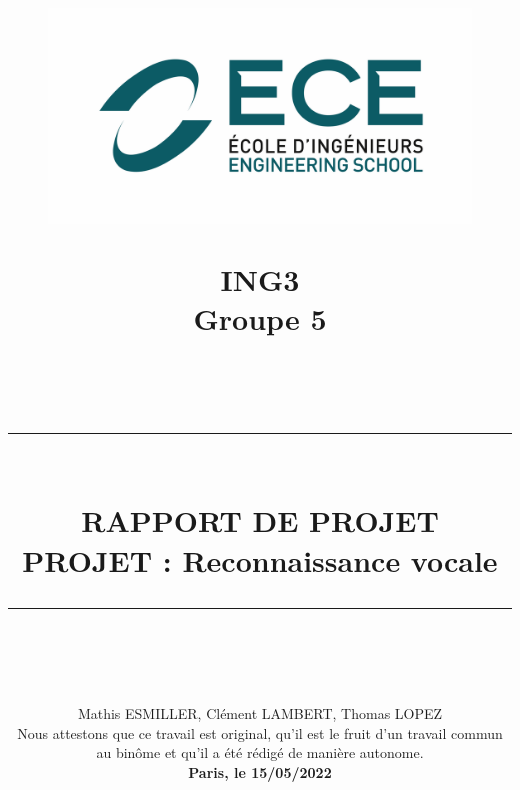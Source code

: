 \documentclass[a4paper,11pt]{book}
\newcommand{\HRule}[1]{\rule{\linewidth}{#1}}
\begin{document}
	
	\begin{titlepage}
	\title{\vspace{-5em}
		\begin{figure}[htb]
			\begin{minipage}[t]{.45\textwidth}
				\centering
				\includegraphics[width=\textwidth]{ece.png}
			\end{minipage}
			\hfill
			\begin{minipage}[t]{.45\textwidth}
				\centering
				\flushright\vspace{-12mm}\Large{\textbf{ING{3}}\\ Groupe {5}}
			\end{minipage}  
		\end{figure}
		\normalsize \textsc{} \\ [1.2cm]
		\HRule{1.5pt} \\ [0.5cm]
		\LARGE \textbf{\Large{RAPPORT DE PROJET}\\ \vspace{5mm}
			\Huge{\textcolor{ece}{PROJET : {Reconnaissance vocale}}}}
		\HRule{1.5pt} \\ 
		\normalsize  \vspace{1cm}
		}
	\date{Mathis ESMILLER, Clément LAMBERT, Thomas LOPEZ\\ Nous attestons que ce travail est original, qu’il est le fruit d’un travail commun au binôme et qu’il a été rédigé de manière autonome. \\ \textbf{{Paris, le 15/05/2022}}}
	
	\author{}
\end{titlepage}
	
\end{document}
